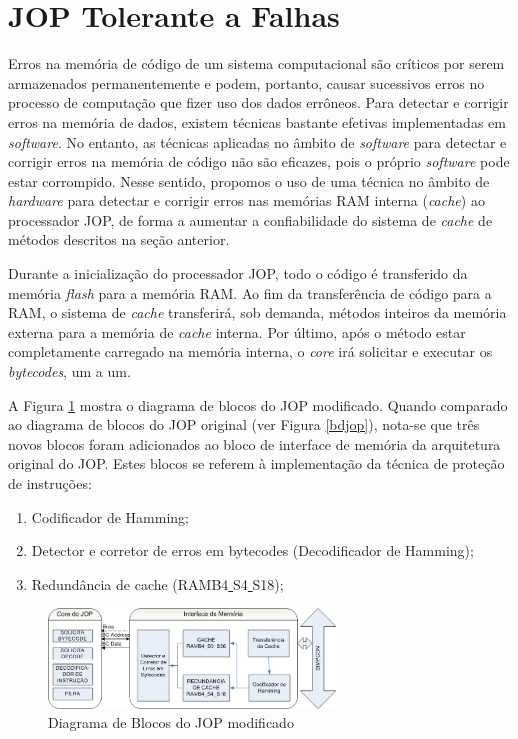 \documentclass[10pt,twocolumn]{article}
\begin{document}
\section{JOP Tolerante a Falhas}
	Erros na memória de código de um sistema computacional são críticos por serem armazenados permanentemente e podem, portanto, causar sucessivos erros no processo de computação que fizer uso dos dados errôneos. Para detectar e corrigir erros na memória de dados, existem técnicas bastante efetivas implementadas em \emph{software}. No entanto, as técnicas aplicadas no âmbito de \emph{software} para detectar e corrigir erros na memória de código não são eficazes, pois o próprio \emph{software} pode estar corrompido. Nesse sentido, propomos o uso de uma técnica no âmbito de \emph{hardware} para detectar e corrigir erros nas memórias RAM interna (\emph{cache}) ao processador JOP, de forma a aumentar a confiabilidade do sistema de \emph{cache} de métodos descritos na seção anterior.

	Durante a inicialização do processador JOP, todo o código é transferido da memória \emph{flash} para a memória RAM. Ao fim da transferência de código para a RAM, o sistema de \emph{cache} transferirá, sob demanda, métodos inteiros da memória externa para a memória de \emph{cache} interna. Por último, após o método estar completamente carregado na memória interna, o \emph{core} irá solicitar e executar os \emph{bytecodes}, um a um.

	A Figura \ref{jopmodificado} mostra o diagrama de blocos do JOP modificado. Quando comparado ao diagrama de blocos do JOP original (ver Figura \ref{bdjop}), nota-se que três novos blocos foram adicionados ao bloco  de interface de memória da arquitetura original  do JOP. Estes blocos se referem à implementação da técnica de proteção de ins\-tru\-ções:
\begin{enumerate}
\item Codificador de Hamming;
\item Detector e corretor de erros em bytecodes (Decodificador de Hamming);
\item Redundância de cache (RAMB4\underline{ }S4\underline{ }S18);
\end{enumerate}


\begin{figure}[!t]
\centering
\includegraphics[width=3.0in]{jopmodificado_port}
\caption{Diagrama de Blocos do JOP modificado}
\label{jopmodificado}
\end{figure}	
\end{document}
